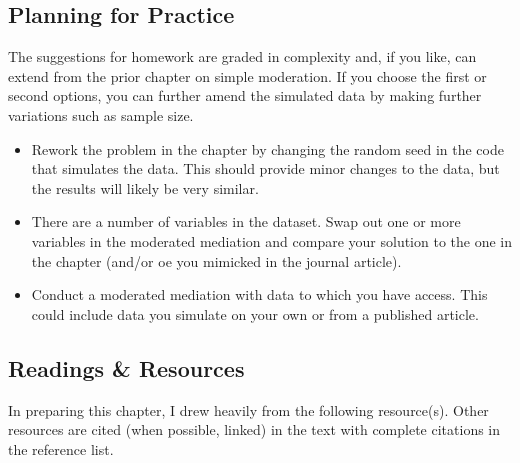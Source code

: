 \documentclass[
]{book}
\providecommand{\tightlist}{%
  \setlength{\itemsep}{0pt}\setlength{\parskip}{0pt}}
\begin{document}
\hypertarget{planning-for-practice-7}{%
\subsection{Planning for Practice}\label{planning-for-practice-7}}

The suggestions for homework are graded in complexity and, if you like, can extend from the prior chapter on simple moderation. If you choose the first or second options, you can further amend the simulated data by making further variations such as sample size.

\begin{itemize}
\tightlist
\item
  Rework the problem in the chapter by changing the random seed in the code that simulates the data. This should provide minor changes to the data, but the results will likely be very similar.
\item
  There are a number of variables in the dataset. Swap out one or more variables in the moderated mediation and compare your solution to the one in the chapter (and/or oe you mimicked in the journal article).
\item
  Conduct a moderated mediation with data to which you have access. This could include data you simulate on your own or from a published article.
\end{itemize}

\hypertarget{readings-resources-7}{%
\subsection{Readings \& Resources}\label{readings-resources-7}}

In preparing this chapter, I drew heavily from the following resource(s). Other resources are cited (when possible, linked) in the text with complete citations in the reference list.
\end{document}
